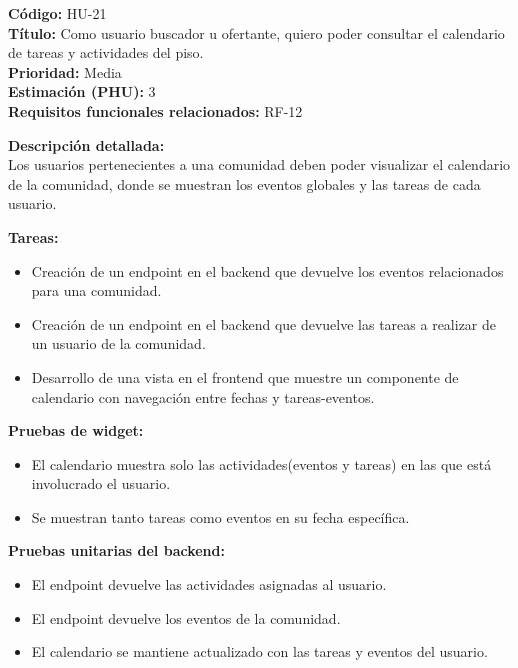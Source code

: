 \begin{tarjetaHU}
\textbf{Código:} HU-21 \\
\textbf{Título:} Como usuario buscador u ofertante, quiero poder consultar el calendario de tareas y actividades del piso. \\
\textbf{Prioridad:} Media \\
\textbf{Estimación (PHU):} 3 \\
\textbf{Requisitos funcionales relacionados:} RF-12

\vspace{0.5em}
\textbf{Descripción detallada:} \\
Los usuarios pertenecientes a una comunidad deben poder visualizar el calendario de la comunidad, donde se muestran los eventos globales y las tareas de cada usuario.

\vspace{0.5em}
\textbf{Tareas:}
\begin{itemize}[left=0pt]
  \item Creación de un endpoint en el backend que devuelve los eventos relacionados para una comunidad.
  \item Creación de un endpoint en el backend que devuelve las tareas a realizar de un usuario de la comunidad.
  \item Desarrollo de una vista en el frontend que muestre un componente de calendario con navegación entre fechas y tareas-eventos.
\end{itemize}

\vspace{0.5em}
\textbf{Pruebas de widget:}
\begin{itemize}[left=0pt]
  \item El calendario muestra solo las actividades(eventos y tareas) en las que está involucrado el usuario.
  \item Se muestran tanto tareas como eventos en su fecha específica.
\end{itemize}
\textbf{Pruebas unitarias del backend:}
\begin{itemize}[left=0pt]
  \item El endpoint devuelve las actividades asignadas al usuario.
  \item El endpoint devuelve los eventos de la comunidad.
  \item El calendario se mantiene actualizado con las tareas y eventos del usuario.
\end{itemize}
\end{tarjetaHU}

